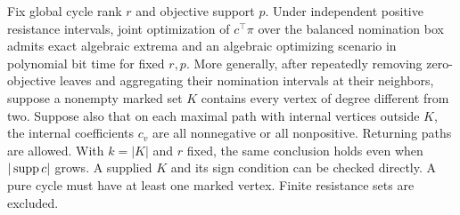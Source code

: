 \begin{theorem}
\label{thm:a-weight-global}
Fix global cycle rank $r$ and objective support $p$. Under independent
positive resistance intervals, joint optimization of $c^\top\pi$ over
the balanced nomination box admits exact algebraic extrema and an
algebraic optimizing scenario in polynomial bit time for fixed $r,p$.
More generally, after repeatedly removing zero-objective leaves and
aggregating their nomination intervals at their neighbors, suppose a
nonempty marked set $K$ contains every vertex of degree different from
two. Suppose also that on each maximal path with internal vertices
outside $K$, the internal coefficients $c_v$ are all nonnegative or all
nonpositive. Returning paths are allowed. With $k=|K|$ and $r$ fixed,
the same conclusion holds even when $|\operatorname{supp} c|$ grows. A supplied $K$
and its sign condition can be checked directly. A pure cycle must have
at least one marked vertex. Finite resistance sets are excluded.
\end{theorem}
